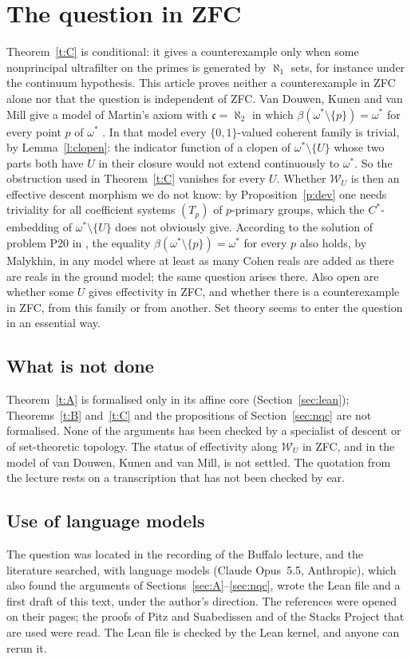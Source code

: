 \documentclass[11pt,a4paper]{amsart}
\theoremstyle{definition}
\theoremstyle{remark}
\begin{document}
\section{The question in ZFC}\label{sec:open}

Theorem~\ref{t:C} is conditional: it gives a counterexample only when some nonprincipal ultrafilter on the primes is generated by $\aleph_1$ sets, for instance under the continuum hypothesis. This article proves neither a counterexample in ZFC alone nor that the question is independent of ZFC. 
Van Douwen, Kunen and van Mill give a model of Martin's axiom with $\mathfrak c=\aleph_2$ in which $\beta(\omega^*\setminus\{p\})=\omega^*$ for every point $p$ of $\omega^*$ \cite{dkm}. In that model every $\{0,1\}$-valued coherent family is trivial, by Lemma~\ref{l:clopen}: the indicator function of a clopen of $\omega^*\setminus\{U\}$ whose two parts both have $U$ in their closure would not extend continuously to $\omega^*$. So the obstruction used in Theorem~\ref{t:C} vanishes for every $U$. Whether $\mathcal W_U$ is then an effective descent morphism we do not know: by Proposition~\ref{p:dev} one needs triviality for all coefficient systems $(T_p)$ of $p$-primary groups, which the $C^*$-embedding of $\omega^*\setminus\{U\}$ does not obviously give. According to the solution of problem P20 in \cite{pearl}, the equality $\beta(\omega^*\setminus\{p\})=\omega^*$ for every $p$ also holds, by Malykhin, in any model where at least as many Cohen reals are added as there are reals in the ground model; the same question arises there. Also open are whether some $U$ gives effectivity in ZFC, and whether there is a counterexample in ZFC, from this family or from another. Set theory seems to enter the question in an essential way.

\subsection*{What is not done}
Theorem~\ref{t:A} is formalised only in its affine core (Section~\ref{sec:lean}); Theorems~\ref{t:B} and~\ref{t:C} and the propositions of Section~\ref{sec:nqc} are not formalised. None of the arguments has been checked by a specialist of descent or of set-theoretic topology. The status of effectivity along $\mathcal W_U$ in ZFC, and in the model of van Douwen, Kunen and van Mill, is not settled. The quotation from the lecture rests on a transcription that has not been checked by ear.

\subsection*{Use of language models}
The question was located in the recording of the Buffalo lecture, and the literature searched, with language models (Claude Opus~5.5, Anthropic), which also found the arguments of Sections~\ref{sec:A}--\ref{sec:nqc}, wrote the Lean file and a first draft of this text, under the author's direction. The references were opened on their pages; the proofs of Pitz and Suabedissen and of the Stacks Project that are used were read. The Lean file is checked by the Lean kernel, and anyone can rerun it.
\end{document}
